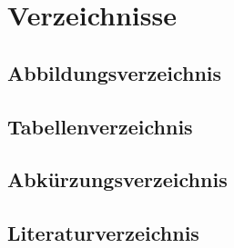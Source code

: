 \section{Verzeichnisse}
\subsection{Abbildungsverzeichnis}
{%
\makeatletter
{}
\makeatother
}

\newpage
\subsection{Tabellenverzeichnis}
{%
\makeatletter
{}
\makeatother
}

\glsaddallunused%
\newpage
\subsection{Abkürzungsverzeichnis}
{%
\renewcommand*{\glossarysection}[2][]{}
\printnoidxglossary[type=\acronymtype, sort=letter]
}
\newpage
\subsection{Literaturverzeichnis}
\printbibliography[heading=none]
